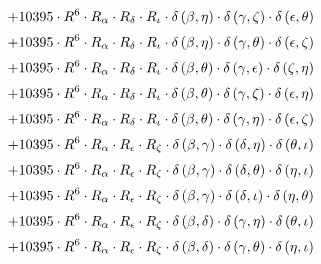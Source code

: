\begin{subequations}
\begin{gather}
 \\[0.2em] \notag 		 + 10395 \cdot R^{6} \cdot R_{\alpha{}} \cdot R_{\delta{}} \cdot R_{\iota{}} \cdot \delta{}\left(\beta{}, \eta{}\right) \cdot \delta{}\left(\gamma{}, \zeta{}\right) \cdot \delta{}\left(\epsilon{}, \theta{}\right) 
 \\[0.2em] \notag 		 + 10395 \cdot R^{6} \cdot R_{\alpha{}} \cdot R_{\delta{}} \cdot R_{\iota{}} \cdot \delta{}\left(\beta{}, \eta{}\right) \cdot \delta{}\left(\gamma{}, \theta{}\right) \cdot \delta{}\left(\epsilon{}, \zeta{}\right) 
 \\[0.2em] \notag 		 + 10395 \cdot R^{6} \cdot R_{\alpha{}} \cdot R_{\delta{}} \cdot R_{\iota{}} \cdot \delta{}\left(\beta{}, \theta{}\right) \cdot \delta{}\left(\gamma{}, \epsilon{}\right) \cdot \delta{}\left(\zeta{}, \eta{}\right) 
 \\[0.2em] \notag 		 + 10395 \cdot R^{6} \cdot R_{\alpha{}} \cdot R_{\delta{}} \cdot R_{\iota{}} \cdot \delta{}\left(\beta{}, \theta{}\right) \cdot \delta{}\left(\gamma{}, \zeta{}\right) \cdot \delta{}\left(\epsilon{}, \eta{}\right) 
 \\[0.2em] \notag 		 + 10395 \cdot R^{6} \cdot R_{\alpha{}} \cdot R_{\delta{}} \cdot R_{\iota{}} \cdot \delta{}\left(\beta{}, \theta{}\right) \cdot \delta{}\left(\gamma{}, \eta{}\right) \cdot \delta{}\left(\epsilon{}, \zeta{}\right) 
 \\[0.2em] \notag 		 + 10395 \cdot R^{6} \cdot R_{\alpha{}} \cdot R_{\epsilon{}} \cdot R_{\zeta{}} \cdot \delta{}\left(\beta{}, \gamma{}\right) \cdot \delta{}\left(\delta{}, \eta{}\right) \cdot \delta{}\left(\theta{}, \iota{}\right) 
 \\[0.2em] \notag 		 + 10395 \cdot R^{6} \cdot R_{\alpha{}} \cdot R_{\epsilon{}} \cdot R_{\zeta{}} \cdot \delta{}\left(\beta{}, \gamma{}\right) \cdot \delta{}\left(\delta{}, \theta{}\right) \cdot \delta{}\left(\eta{}, \iota{}\right) 
 \\[0.2em] \notag 		 + 10395 \cdot R^{6} \cdot R_{\alpha{}} \cdot R_{\epsilon{}} \cdot R_{\zeta{}} \cdot \delta{}\left(\beta{}, \gamma{}\right) \cdot \delta{}\left(\delta{}, \iota{}\right) \cdot \delta{}\left(\eta{}, \theta{}\right) 
 \\[0.2em] \notag 		 + 10395 \cdot R^{6} \cdot R_{\alpha{}} \cdot R_{\epsilon{}} \cdot R_{\zeta{}} \cdot \delta{}\left(\beta{}, \delta{}\right) \cdot \delta{}\left(\gamma{}, \eta{}\right) \cdot \delta{}\left(\theta{}, \iota{}\right) 
 \\[0.2em] \notag 		 + 10395 \cdot R^{6} \cdot R_{\alpha{}} \cdot R_{\epsilon{}} \cdot R_{\zeta{}} \cdot \delta{}\left(\beta{}, \delta{}\right) \cdot \delta{}\left(\gamma{}, \theta{}\right) \cdot \delta{}\left(\eta{}, \iota{}\right) 

\end{gather}
\end{subequations}
